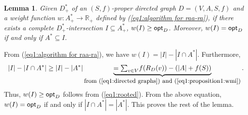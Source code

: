 \documentclass[11pt]{article}
\newcounter{ni}
\theoremstyle{plain}
\newtheorem{lemma}[theorem]{Lemma}\newtheorem{corollary}[theorem]{Corollary}\newtheorem{definition}[theorem]{Definition}\newtheorem{proposition}[theorem]{Proposition}\newtheorem{claim}[theorem]{Claim}\newtheorem{fact}[theorem]{Fact}\newtheorem{example}{Example}
\newcommand{\eop}{\hfill \usebox{\ProofSym}}
\newenvironment{proof}{\noindent {\it Proof.}}{\eop\par\vspace{0.3cm}}
\begin{document}
\begin{lemma} \label{proposition1:wmi}
Given $D_+^{\ast}$ of an $(S,f)$-proper directed graph 
$D=(V,A,S,f)$ and a weight function $w\colon A_+^{\ast} \to \mathbb{R}_+$ 
defined by (\ref{eq1:algorithm for raa-ra}),
if there exists a complete $D_+^{\ast}$-intersection $I\subseteq A^{\ast}_+$, $w(I) \ge {\sf opt}_D$. 
Moreover, $w(I)={\sf opt}_D$ if and only if $A^{\ast}\subseteq I$. 
\end{lemma}
\begin{proof}
From (\ref{eq1:algorithm for raa-ra}), we have 
$w(I)=|I| - |I\cap A^{\ast}|$.  
Furthermore, 
\begin{equation*}
|I|-|I\cap A^{\ast}| \ge |I| -|A^{\ast}|
\underbrace{ 
=\mbox{$\sum$}_{v \in V}f(R_D(v))-(|A|+f(S))
}_{\mbox{\small from (\ref{eq1:directed graphs}) and (\ref{eq1:proposition1:wmi})}}.
\end{equation*} 
Thus, $w(I)\ge {\sf opt}_D$ follows from (\ref{eq1:rooted}). 
From the above equation, $w(I)={\sf opt}_D$ if and only if $|I\cap A^{\ast}|=|A^{\ast}|$. 
This proves the rest of the lemma. 
\hfill\usebox{\ProofSym}
\end{proof}
\end{document}

